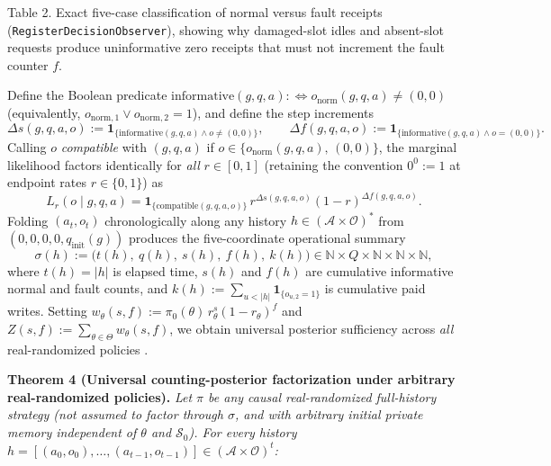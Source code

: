 \documentclass[11pt,a4paper]{article}
\begin{document}
Table 2. Exact five-case classification of normal versus fault receipts
(\texttt{RegisterDecisionObserver}), showing why damaged-slot idles and
absent-slot requests produce uninformative zero receipts that must not
increment the fault counter \(f\).

Define the Boolean predicate
\(\mathrm{informative}(g, q, a) :\iff o_{\mathrm{norm}}(g, q, a) \neq (0,0)\)
(equivalently, \(o_{\mathrm{norm},1} \lor o_{\mathrm{norm},2} = 1\)),
and define the step increments
\[\Delta s(g, q, a, o) := \mathbf{1}_{\{\mathrm{informative}(g,q,a) \land o \neq (0,0)\}}, \qquad
\Delta f(g, q, a, o) := \mathbf{1}_{\{\mathrm{informative}(g,q,a) \land o = (0,0)\}}.\]
Calling \(o\) \emph{compatible} with \((g, q, a)\) if
\(o \in \{o_{\mathrm{norm}}(g, q, a),\, (0,0)\}\), the marginal
likelihood factors identically for \emph{all} \(r \in [0,1]\) (retaining
the convention \(0^0 := 1\) at endpoint rates \(r \in \{0,1\}\)) as
\[L_r(o \mid g, q, a) = \mathbf{1}_{\{\mathrm{compatible}(g, q, a, o)\}}\, r^{\Delta s(g, q, a, o)} (1 - r)^{\Delta f(g, q, a, o)}.\]
Folding \((a_t, o_t)\) chronologically along any history
\(h \in (\mathcal{A} \times \mathcal{O})^*\) from
\((0, 0, 0, 0, q_{\mathrm{init}}(g))\) produces the five-coordinate
operational summary
\[\sigma(h) := \bigl(t(h),\ q(h),\ s(h),\ f(h),\ k(h)\bigr) \in \mathbb{N} \times Q \times \mathbb{N} \times \mathbb{N} \times \mathbb{N},\]
where \(t(h) = |h|\) is elapsed time, \(s(h)\) and \(f(h)\) are
cumulative informative normal and fault counts, and
\(k(h) := \sum_{u < |h|} \mathbf{1}_{\{o_{u,2} = 1\}}\) is cumulative
paid writes. Setting
\(w_\theta(s, f) := \pi_0(\theta)\, r_\theta^s (1 - r_\theta)^f\) and
\(Z(s, f) := \sum_{\theta \in \Theta} w_\theta(s, f)\), we obtain
universal posterior sufficiency across \emph{all} real-randomized
policies \citep{halmosSavage1949, dynkin1978}.

\textbf{Theorem 4 (Universal counting-posterior factorization under
arbitrary real-randomized policies).} \emph{Let \(\pi\) be any causal
real-randomized full-history strategy (not assumed to factor through
\(\sigma\), and with arbitrary initial private memory independent of
\(\theta\) and \(\mathcal{S}_0\)). For every history
\(h = [(a_0, o_0), \dots, (a_{t-1}, o_{t-1})] \in (\mathcal{A} \times \mathcal{O})^t\):}
\end{document}
